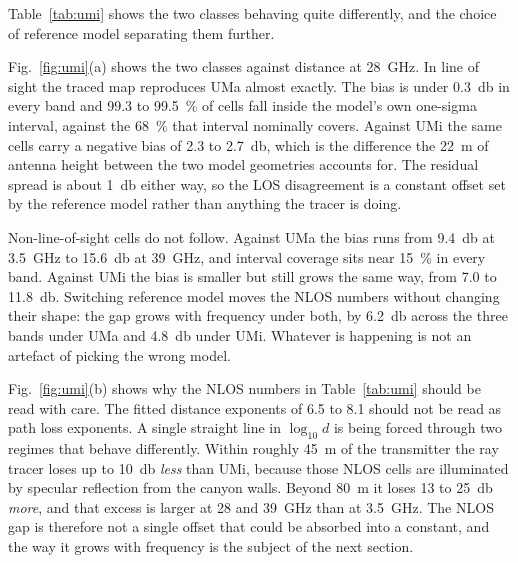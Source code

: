 \documentclass[conference]{IEEEtran}
\begin{document}
Table~\ref{tab:umi} shows the two classes behaving quite differently, and the
choice of reference model separating them further.

Fig.~\ref{fig:umi}(a) shows the two classes against distance at
\SI{28}{\giga\hertz}. In line of sight the traced map reproduces UMa almost
exactly. The bias is
under \SI{0.3}{\decibel} in every band and \SI{99.3}{} to \SI{99.5}{\percent}
of cells fall inside the model's own one-sigma interval, against the
\SI{68}{\percent} that interval nominally covers. Against UMi the same cells
carry a negative bias of \SI{2.3}{} to \SI{2.7}{\decibel}, which is the
difference the \SI{22}{\metre} of antenna height between the two model
geometries accounts for. The residual spread is about \SI{1}{\decibel} either
way, so the LOS disagreement is a constant offset set by the reference model
rather than anything the tracer is doing.

Non-line-of-sight cells do not follow. Against UMa the bias runs from
\SI{9.4}{\decibel} at \SI{3.5}{\giga\hertz} to \SI{15.6}{\decibel} at
\SI{39}{\giga\hertz}, and interval coverage sits near \SI{15}{\percent} in
every band. Against UMi the bias is smaller but still grows the same way, from
\SI{7.0}{} to \SI{11.8}{\decibel}. Switching reference model moves the NLOS
numbers without changing their shape: the gap grows with frequency under both,
by \SI{6.2}{\decibel} across the three bands under UMa and \SI{4.8}{\decibel}
under UMi. Whatever is happening is not an artefact of picking the wrong
model.

Fig.~\ref{fig:umi}(b) shows why the NLOS numbers in Table~\ref{tab:umi}
should be read with care. The fitted distance exponents of \num{6.5} to
\num{8.1} should not be read as path loss exponents. A single straight line in $\log_{10} d$ is being
forced through two regimes that behave differently. Within roughly
\SI{45}{\metre} of the transmitter the ray tracer loses up to
\SI{10}{\decibel} \emph{less} than UMi, because those NLOS cells are
illuminated by specular reflection from the canyon walls. Beyond
\SI{80}{\metre} it loses \SI{13}{} to \SI{25}{\decibel} \emph{more}, and that
excess is larger at \SI{28}{} and \SI{39}{\giga\hertz} than at
\SI{3.5}{\giga\hertz}. The NLOS gap is therefore not a single offset that could
be absorbed into a constant, and the way it grows with frequency is the subject
of the next section.
\end{document}

